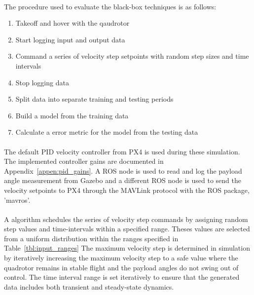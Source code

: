         \paragraph{}
        The procedure used to evaluate the black-box techniques is as follows:
        \begin{enumerate}
            \item Takeoff and hover with the qaudrotor
            \item Start logging input and output data
            \item Command a series of velocity step setpoints with random step sizes and time intervals
            \item Stop logging data
            \item Split data into separate training and testing periods
            \item Build a model from the training data
            \item Calculate a error metric for the model from the testing data
        \end{enumerate}

        \paragraph{}
        The default PID velocity controller from PX4 is used during these simulation.
        The implemented controller gains are documented in Appendix~\ref{appen:pid_gains}.
        A ROS node is used to read and log the payload angle measurement from Gazebo and a different
        ROS node is used to send the velocity setpoints to PX4 
        through the MAVLink protocol with the ROS package, 'mavros'.

        \paragraph{}
        A algorithm schedules the series of velocity step commands 
        by assigning random step values and time-intervals within a specified range.
        Theses values are selected from a uniform distribution 
        within the ranges specified in Table~\ref{tbl:input_ranges}
        The maximum velocity step is determined in simulation by iteratively increasing the maximum velocity step 
        to a safe value where the quadrotor remains in stable flight
        and the payload angles do not swing out of control.
        The time interval range is set iteratively to ensure 
        that the generated data includes both transient and steady-state dynamics.
 

